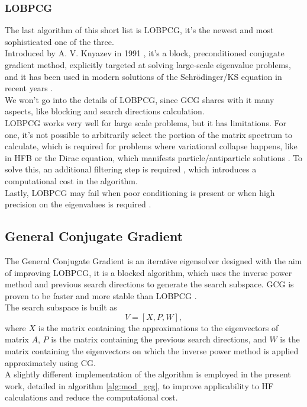 \subsubsection{LOBPCG}
The last algorithm of this short list is LOBPCG, it's the newest and most sophisticated one of the three.
\\Introduced by A. V. Knyazev in 1991 \cite{LOBPCG}, it's a block, preconditioned conjugate gradient method, explicitly targeted at solving large-scale eigenvalue problems, and it has been used in modern solutions of the Schr\"odinger/KS equation in recent years \cite{LOBPCGDKS,Nottoli2023,LIN2013205,li2020efficient}.
\\We won't go into the details of LOBPCG, since GCG shares with it many aspects, like blocking and search directions calculation.
\\LOBPCG works very well for large scale problems, but it has limitations. 
For one, it's not possible to arbitrarily select the portion of the matrix spectrum to calculate, which is required for problems where variational collapse happens, like in HFB or the Dirac equation, which manifests particle/antiparticle solutions \cite{li2020efficient}.
To solve this, an additional filtering step is required \cite{LIN2013205,li2020efficient}, which introduces a computational cost in the algorithm.
\\Lastly, LOBPCG may fail when poor conditioning is present or when high precision on the eigenvalues is required \cite{GCG1}.
\subsection{General Conjugate Gradient}
\label{sec:gcg}
The General Conjugate Gradient is an iterative eigensolver designed with the aim of improving LOBPCG, it is a blocked algorithm, which uses the inverse power method and previous search directions to generate the search subspace. GCG is proven to be faster and more stable than LOBPCG \cite{GCG1}.
\\The search subspace is built as
\begin{equation}
    V = [X, P, W],
\end{equation}
where $X$ is the matrix containing the approximations to the eigenvectors of matrix $A$, $P$ is the matrix containing the previous search directions, and $W$ is the matrix containing the eigenvectors on which the inverse power method is applied approximately using CG.
\\A slightly different implementation of the algorithm is employed in the present work, detailed in algorithm \ref{alg:mod_gcg}, to improve applicability to HF calculations and reduce the computational cost.
